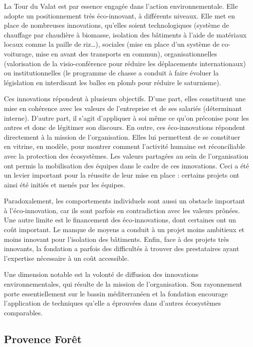         La Tour du Valat est par essence engagée dans l’action environnementale. Elle adopte un positionnement très éco-innovant, à différents niveaux. Elle met en place de nombreuses innovations, qu’elles soient technologiques (système de chauffage par chaudière à biomasse, isolation des bâtiments à l’aide de matériaux locaux comme la paille de riz…), sociales (mise en place d’un système de co-voiturage, mise en avant des transports en commun), organisationnelles (valorisation de la visio-conférence pour réduire les déplacements internationaux) ou institutionnelles (le programme de chasse a conduit à faire évoluer la législation en interdisant les balles en plomb pour réduire le saturnisme).

        Ces innovations répondent à plusieurs objectifs. D’une part, elles constituent une mise en cohérence avec les valeurs de l’entreprise et de ses salariés (déterminant interne). D’autre part, il s’agit d’appliquer à soi même ce qu’on préconise pour les autres et donc de légitimer son discours. En outre, ces éco-innovations répondent directement à la mission de l’organisation. Elles lui permettent de se constituer en vitrine, en modèle, pour montrer comment l’activité humaine est réconciliable avec la protection des écosystèmes. Les valeurs partagées au sein de l’organisation ont permis la mobilisation des équipes dans le cadre de ces innovations. Ceci a été un levier important pour la réussite de leur mise en place : certains projets ont ainsi été initiés et menés par les équipes.

        Paradoxalement, les comportements individuels sont aussi un obstacle important à l’éco-innovation, car ils sont parfois en contradiction avec les valeurs prônées. Une autre limite est le financement des éco-innovations, dont certaines ont un coût important. Le manque de moyens a conduit à un projet moins ambitieux et moins innovant pour l’isolation des bâtiments. Enfin, face à des projets très innovants, la fondation a parfois des difficultés à trouver des prestataires ayant l’expertise nécessaire à un coût accessible.

        Une dimension notable est la volonté de diffusion des innovations environnementales, qui résulte de la mission de l’organisation. Son rayonnement porte essentiellement sur le bassin méditerranéen et la fondation encourage l’application de techniques qu’elle a éprouvées dans d’autres écosystèmes comparables.


    \subsection{Provence Forêt}

